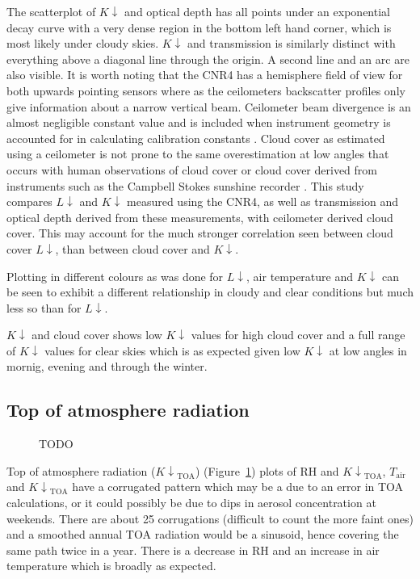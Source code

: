 \documentclass[a4paper,titlepage, twoside]{report}
\newcommand\Kdown{K\!\!\downarrow}
\newcommand\Ldown{L\!\!\downarrow}
\newcommand\Kdowntoa{{K\!\!\downarrow}_\mathrm{TOA}}
\begin{document}
The scatterplot of $\Kdown$ and optical depth has all points under an exponential decay curve with a very dense region in the bottom left hand corner, which is most likely under cloudy skies. $\Kdown$ and transmission is similarly distinct with everything above a diagonal line through the origin. A second line and an arc are also visible. It is worth noting that the CNR4 has a hemisphere field of view for both upwards pointing sensors where as the ceilometers backscatter profiles only give information about a narrow vertical beam. Ceilometer beam divergence is an almost negligible constant value and is included when instrument geometry is accounted for in calculating calibration constants \parencite{vaisala2}.  Cloud cover as estimated using a ceilometer is not prone to the same overestimation at low angles that occurs with human observations of cloud cover or cloud cover derived from instruments such as the Campbell Stokes sunshine recorder \parencite{monteith}. This study compares $\Ldown$ and $\Kdown$ measured using the CNR4, as  well as transmission and optical depth derived from these measurements, with ceilometer derived cloud cover. This may account for the much stronger correlation seen between cloud cover $\Ldown$, than between cloud cover and $\Kdown$.

Plotting in different colours as was done for $\Ldown$, air temperature and $\Kdown$ can be seen to exhibit a different relationship in cloudy and clear conditions but much less so than for $\Ldown$.

$\Kdown$ and cloud cover shows low $\Kdown$ values for high cloud cover and a full range of $\Kdown$ values for clear skies which is as expected given low $\Kdown$ at low angles in mornig, evening and through the winter.

\subsection{Top of atmosphere radiation}
\begin{figure}
\centering
\caption{TODO}
\label{fig:data-4}
\end{figure}
Top of atmosphere radiation ($\Kdowntoa$) (Figure~\ref{fig:data-4}) plots of $\mathrm{RH}$ and $\Kdowntoa$, $T_\mathrm{air}$ and $\Kdowntoa$ have a corrugated pattern which may be a due to an error in TOA calculations, or it could possibly be due to dips in aerosol concentration at weekends. There are about 25 corrugations (difficult to count the more faint ones) and a smoothed annual TOA radiation would be a sinusoid, hence  covering the same path twice in a year. There is a decrease in RH and an increase in air temperature which is broadly as expected.
\end{document}
